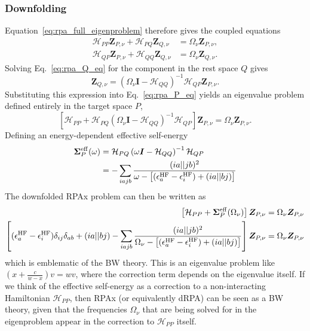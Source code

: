 \subsubsection{Downfolding}
Equation~\eqref{eq:rpa_full_eigenproblem} therefore gives the coupled equations
\begin{align}
    \mathcal{H}_{PP}\bm{Z}_{P,\nu}
    +
    \mathcal{H}_{PQ}\bm{Z}_{Q,\nu}
    &=
    \Omega_{\nu}\bm{Z}_{P,\nu},
    \label{eq:rpa_P_eq}
    \\
    \mathcal{H}_{QP}\bm{Z}_{P,\nu}
    +
    \mathcal{H}_{QQ}\bm{Z}_{Q,\nu}
    &=
    \Omega_{\nu}\bm{Z}_{Q,\nu}.
    \label{eq:rpa_Q_eq}
\end{align}
Solving Eq.~\eqref{eq:rpa_Q_eq} for the component in the rest space $Q$ gives
\begin{equation}
    \bm{Z}_{Q,\nu}
    =
    \left(
        \Omega_{\nu}\bm{I}
        -
        \mathcal{H}_{QQ}
    \right)^{-1}
    \mathcal{H}_{QP}
    \bm{Z}_{P,\nu}.
    \label{eq:rpa_Q_solution}
\end{equation}
Substituting this expression into Eq.~\eqref{eq:rpa_P_eq} yields an
eigenvalue problem defined entirely in the target space $P$,
\begin{equation}
    \left[
        \mathcal{H}_{PP}
        +
        \mathcal{H}_{PQ}
        \left(
            \Omega_{\nu}\bm{I}
            -
            \mathcal{H}_{QQ}
        \right)^{-1}
        \mathcal{H}_{QP}
    \right]
    \bm{Z}_{P,\nu}
    =
    \Omega_{\nu}
    \bm{Z}_{P,\nu}.
    \label{eq:rpa_downfolded}
\end{equation}
Defining an energy-dependent effective self-energy
\begin{align}
    \bm{\Sigma}^{\mathrm{eff}}_{P}(\omega)
    &=
    \mathcal{H}_{PQ}
    \left(
        \omega\bm{I}
        -
        \mathcal{H}_{QQ}
    \right)^{-1}
    \mathcal{H}_{QP}\\
&= -\sum_{iajb}
\frac{(ia||jb)^2}{\omega -\left[(\epsilon_a^{\rm HF} - \epsilon_i^{\rm HF}) + (ia||bj)\right]}
\end{align}
The downfolded RPAx problem can then be written as
\begin{align}
    \left[
        \mathcal{H}_{PP}
        +
        \bm{\Sigma}^{\mathrm{eff}}_{P}(\Omega_{\nu})
    \right]
    \bm{Z}_{P,\nu}
    &=
    \Omega_{\nu}
    \bm{Z}_{P,\nu}\\
\left[(\epsilon_a^{\rm HF} - \epsilon_i^{\rm HF}) \delta_{ij}\delta_{ab} + (ia||bj) - \sum_{iajb}
\frac{(ia||jb)^2}{\Omega_\nu -\left[(\epsilon_a^{\rm HF} - \epsilon_i^{\rm HF}) + (ia||bj)\right]}\right]\bm{Z}_{P,\nu}
    &=
    \Omega_{\nu}
    \bm{Z}_{P,\nu}
    \label{eq:rpa_bw_form}
\end{align}
which is emblematic of the BW theory. This is an eigenvalue problem like $(x+\frac{c}{w-x})v=wv$, where the correction term depends on the eigenvalue itself. If we think of the effective self-energy as a correction to a non-interacting Hamiltonian $\mathcal{H}_{PP}$, then RPAx (or equivalently dRPA) can be seen as a BW theory, given that the frequencies $\Omega_\nu$ that are being solved for in the eigenproblem appear in the correction to $\mathcal{H}_{PP}$ itself.
